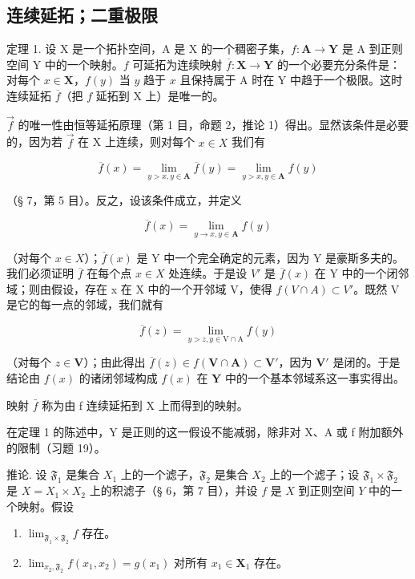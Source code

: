 \subsection{连续延拓；二重极限}

定理 1. 设 X 是一个拓扑空间，A 是 X 的一个稠密子集，\(f: \mathbf{A} \to \mathbf{Y}\) 是 A 到正则空间 Y 中的一个映射。\(f\) 可延拓为连续映射 \(\overline{f}: \mathbf{X} \to \mathbf{Y}\) 的一个必要充分条件是：对每个 \(x \in \mathbf{X}\)，\(f(y)\) 当 \(y\) 趋于 \(x\) 且保持属于 A 时在 Y 中趋于一个极限。这时连续延拓 \(\overline{f}\)（把 \(f\) 延拓到 X 上）是唯一的。

\(\vec{f}\) 的唯一性由恒等延拓原理（第 1 目，命题 2，推论 1）得出。显然该条件是必要的，因为若 \(\vec{f}\) 在 X 上连续，则对每个 \(x \in X\) 我们有

\[
\overline {{f}} (x) = \lim _ {y > x, y \in \mathbf {A}} \overline {{f}} (y) = \lim _ {y > x, y \in \mathbf {A}} f (y)
\]

（§ 7，第 5 目）。反之，设该条件成立，并定义

\[
\overline {{f}} (x) = \lim _ {y \rightarrow x, y \in \mathbf {A}} f (y)
\]

（对每个 \(x \in X\)）；\(\overline{f}(x)\) 是 Y 中一个完全确定的元素，因为 Y 是豪斯多夫的。我们必须证明 \(\overline{f}\) 在每个点 \(x \in X\) 处连续。于是设 \(V'\) 是 \(\overline{f}(x)\) 在 Y 中的一个闭邻域；则由假设，存在 x 在 X 中的一个开邻域 V，使得 \(f(V \cap A) \subset V'\)。既然 V 是它的每一点的邻域，我们就有

\[
\overline {{f}} (z) = \lim _ {y > z, y \in \mathrm{V} \cap \mathrm{A}} f (y)
\]

（对每个 \(z \in \mathbf{V}\)）；由此得出 \(\overline{f}(z) \in f(\mathbf{V} \cap \mathbf{A}) \subset \mathbf{V}'\)，因为 \(\mathbf{V}'\) 是闭的。于是结论由 \(f(x)\) 的诸闭邻域构成 \(f(x)\) 在 \(\mathbf{Y}\) 中的一个基本邻域系这一事实得出。

映射 \(\bar{f}\) 称为由 f 连续延拓到 X 上而得到的映射。

在定理 1 的陈述中，Y 是正则的这一假设不能减弱，除非对 X、A 或 f 附加额外的限制（习题 19）。

推论. 设 \(\mathfrak{F}_1\) 是集合 \(X_1\) 上的一个滤子，\(\mathfrak{F}_2\) 是集合 \(X_2\) 上的一个滤子；设 \(\mathfrak{F}_1 \times \mathfrak{F}_2\) 是 \(X = X_1 \times X_2\) 上的积滤子（§ 6，第 7 目），并设 \(f\) 是 \(X\) 到正则空间 \(Y\) 中的一个映射。假设

\begin{enumerate}
\def\labelenumi{\alph{enumi})}
\item
  \(\lim_{\mathfrak{F}_1\times \mathfrak{F}_2}f\) 存在。
\item
  \(\lim_{x_2, \mathfrak{F}_2} f(x_1, x_2) = g(x_1)\) 对所有 \(x_1 \in \mathbf{X}_1\) 存在。
\end{enumerate}

